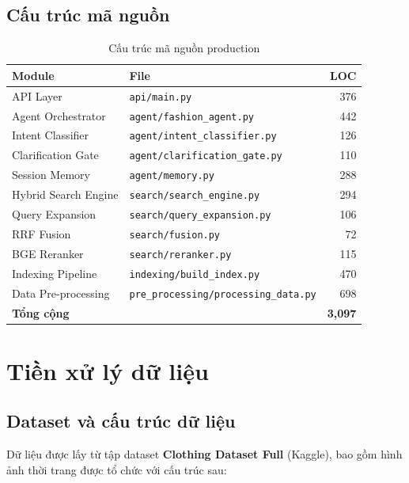 \documentclass[12pt,a4paper]{report}
\begin{document}
\section{Cấu trúc mã nguồn}

\begin{table}[H]
\centering
\begin{tabular}{llr}
\toprule
\textbf{Module} & \textbf{File} & \textbf{LOC}\\
\midrule
API Layer & \texttt{api/main.py} & 376\\
Agent Orchestrator & \texttt{agent/fashion\_agent.py} & 442\\
Intent Classifier & \texttt{agent/intent\_classifier.py} & 126\\
Clarification Gate & \texttt{agent/clarification\_gate.py} & 110\\
Session Memory & \texttt{agent/memory.py} & 288\\
Hybrid Search Engine & \texttt{search/search\_engine.py} & 294\\
Query Expansion & \texttt{search/query\_expansion.py} & 106\\
RRF Fusion & \texttt{search/fusion.py} & 72\\
BGE Reranker & \texttt{search/reranker.py} & 115\\
Indexing Pipeline & \texttt{indexing/build\_index.py} & 470\\
Data Pre-processing & \texttt{pre\_processing/processing\_data.py} & 698\\
\midrule
\textbf{Tổng cộng} & & \textbf{3,097}\\
\bottomrule
\end{tabular}
\caption{Cấu trúc mã nguồn production}
\end{table}

\chapter{Tiền xử lý dữ liệu}

\section{Dataset và cấu trúc dữ liệu}
Dữ liệu được lấy từ tập dataset \textbf{Clothing Dataset Full} (Kaggle), bao gồm hình ảnh thời trang được tổ chức với cấu trúc sau:
\end{document}
